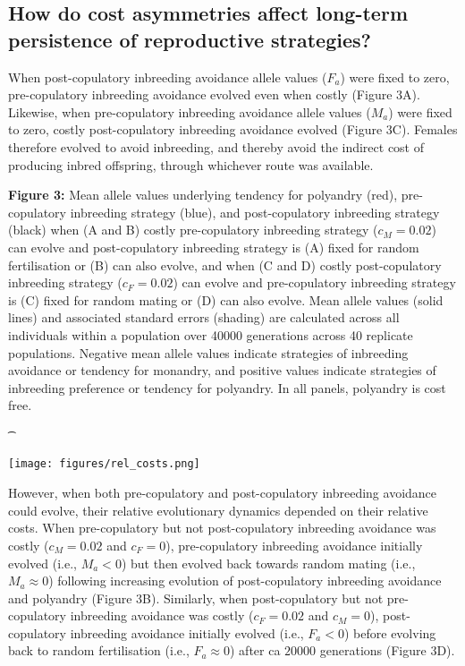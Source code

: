 \documentclass[10pt,letterpaper]{article}
\begin{document}
\subsection*{How do cost asymmetries affect long-term persistence of reproductive strategies?}

When post-copulatory inbreeding avoidance allele values ($F_{a}$) were fixed to zero, pre-copulatory inbreeding avoidance evolved even when costly (Figure 3A). Likewise, when pre-copulatory inbreeding avoidance allele values ($M_{a}$) were fixed to zero, costly post-copulatory inbreeding avoidance evolved (Figure 3C). Females therefore evolved to avoid inbreeding, and thereby avoid the indirect cost of producing inbred offspring, through whichever route was available. 

{\color{Gray}
\begin{adjustwidth}{-2.2in}{0in}
{%
   \begin{justify}\vspace{0.25 mm} \textbf{Figure 3:} Mean allele values underlying tendency for polyandry (red), pre-copulatory inbreeding strategy (blue), and post-copulatory inbreeding strategy (black) when (A and B) costly pre-copulatory inbreeding strategy ($c_{M} = 0.02$) can evolve and post-copulatory inbreeding strategy is (A) fixed for random fertilisation or (B) can also evolve, and when (C and D) costly post-copulatory inbreeding strategy ($c_{F} = 0.02$) can evolve and pre-copulatory inbreeding strategy is (C) fixed for random mating or (D) can also evolve. Mean allele values (solid lines) and associated standard errors (shading) are calculated across all individuals within a population over 40000 generations across 40 replicate populations. Negative mean allele values indicate strategies of inbreeding avoidance or tendency for monandry, and positive values indicate strategies of inbreeding preference or tendency for polyandry. In all panels, polyandry is cost free. \end{justify}{\t}%
}
{%
   \texttt{[image: figures/rel\_costs.png]}%
}%
\end{adjustwidth}
}

However, when both pre-copulatory and post-copulatory inbreeding avoidance could evolve, their relative evolutionary dynamics depended on their relative costs. When pre-copulatory but not post-copulatory inbreeding avoidance was costly ($c_{M}=0.02$ and $c_{F}=0$), pre-copulatory inbreeding avoidance initially evolved (i.e., $M_{a} < 0$) but then evolved back towards random mating (i.e., $M_{a} \approx 0$) following increasing evolution of post-copulatory inbreeding avoidance and polyandry (Figure 3B). Similarly, when post-copulatory but not pre-copulatory inbreeding avoidance was costly ($c_{F}=0.02$ and $c_{M}=0$), post-copulatory inbreeding avoidance initially evolved (i.e., $F_{a} < 0$) before evolving back to random fertilisation (i.e., $F_{a} \approx 0$) after ca $20000$ generations (Figure 3D).
\end{document}
